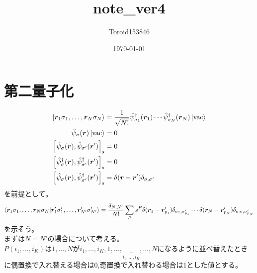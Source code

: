 \documentclass{ltjsarticle}
\title{note\_ver4}
\author{Toroid153846}
\date{\today}
\begin{document}
\maketitle

\section{第二量子化}

  \begin{align}
    \ket{\bm{r}_1\sigma_1,\dots,\bm{r}_N\sigma_N}&=\frac{1}{\sqrt{N!}}\hat{\psi}_{\sigma_1}^\dag (\bm{r}_1)\cdots\hat{\psi}_{\sigma_N}^\dag (\bm{r}_N)\ket{\rm{vac}} \\
    \hat{\psi}_\sigma (\bm{r})\ket{\rm{vac}}&=0\\
    \comm{\hat{\psi}_\sigma(\bm{r})}{\hat{\psi}_{\sigma'}(\bm{r}')}_s&=0\\
    \comm{\hat{\psi}^\dag_\sigma(\bm{r})}{\hat{\psi}^\dag_{\sigma'}(\bm{r}')}_s&=0\\
    \comm{\hat{\psi}_\sigma(\bm{r})}{\hat{\psi}^\dag_{\sigma'}(\bm{r}')}_s&=\delta(\bm{r}-\bm{r}')\delta_{\sigma,\sigma'}
  \end{align}
を前提として。
\begin{align}
  \braket{\bm{r}_1\sigma_1,\dots,\bm{r}_N\sigma_N}{\bm{r}'_1\sigma'_1,\dots,\bm{r}'_{N'}\sigma'_{N'}}=\frac{\delta_{N,N'}}{N!}\sum_P s^P\delta(\bm{r}_1-\bm{r}'_{p_1})\delta_{\sigma_1,\sigma'_{p_1}}\cdots\delta(\bm{r}_N-\bm{r}'_{p_N})\delta_{\sigma_N,\sigma'_{p_N}}
\end{align}
を示そう。\\
まずは$N=N'$の場合について考える。\\
$P(i_1,\dots,i_K)$は$1,\dots,N$が$i_1,\dots,i_K,1,\dots,\underbrace{}_{i_1,\dots,i_K},\dots,N$になるように並べ替えたときに偶置換で入れ替える場合は0,奇置換で入れ替わる場合は1とした値とする。
\end{document}
